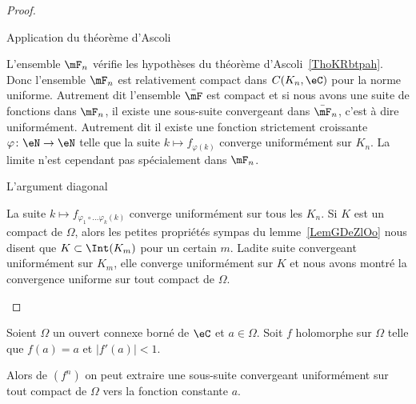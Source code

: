 \begin{proof}
\begin{subproof}
    \item[Application du théorème d'Ascoli]

        L'ensemble \( \mF_n\) vérifie les hypothèses du théorème d'Ascoli~\ref{ThoKRbtpah}. Donc l'ensemble \( \mF_n\) est relativement compact dans \( C(K_n,\eC)\) pour la norme uniforme. Autrement dit l'ensemble \( \bar\mF\) est compact et si nous avons une suite de fonctions dans \( \mF_n\), il existe une sous-suite convergeant dans \( \bar\mF_n\), c'est à dire uniformément. Autrement dit il existe une fonction strictement croissante \( \varphi\colon \eN\to \eN\) telle que la suite \( k\mapsto f_{\varphi(k)}\) converge uniformément sur \( K_n\). La limite n'est cependant pas spécialement dans \( \mF_n\).

    \item[L'argument diagonal]

        La suite \( k\mapsto f_{\varphi_1\circ\ldots\varphi_k(k)}\) converge uniformément sur tous les \( K_n\). Si \( K\) est un compact de \( \Omega\), alors les petites propriétés sympas du lemme~\ref{LemGDeZlOo} nous disent que \( K\subset \Int(K_m)\) pour un certain \( m\). Ladite suite convergeant uniformément sur \( K_m\), elle converge uniformément sur \( K\) et nous avons montré la convergence uniforme sur tout compact de \( \Omega\).

    \end{subproof}
\end{proof}

\begin{corollary}
    Soient \( \Omega\) un ouvert connexe borné de \( \eC\) et \( a\in \Omega\). Soit \( f\) holomorphe sur \( \Omega\) telle que \( f(a)=a\) et \( | f'(a) |<1\).

    Alors de \( (f^n)\) on peut extraire une sous-suite convergeant uniformément sur tout compact de \( \Omega\) vers la fonction constante \( a\).
\end{corollary}

